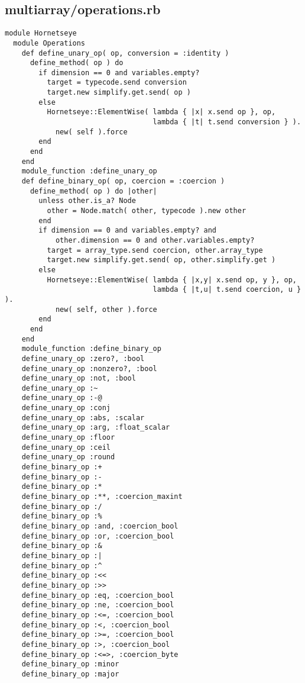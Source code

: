 \subsection{multiarray/operations.rb}\label{cha:multiarray-operations-rb}
\begin{lstlisting}
module Hornetseye
  module Operations
    def define_unary_op( op, conversion = :identity )
      define_method( op ) do
        if dimension == 0 and variables.empty?
          target = typecode.send conversion
          target.new simplify.get.send( op )
        else
          Hornetseye::ElementWise( lambda { |x| x.send op }, op,
                                   lambda { |t| t.send conversion } ).
            new( self ).force
        end
      end
    end
    module_function :define_unary_op
    def define_binary_op( op, coercion = :coercion )
      define_method( op ) do |other|
        unless other.is_a? Node
          other = Node.match( other, typecode ).new other
        end
        if dimension == 0 and variables.empty? and
            other.dimension == 0 and other.variables.empty?
          target = array_type.send coercion, other.array_type
          target.new simplify.get.send( op, other.simplify.get )
        else
          Hornetseye::ElementWise( lambda { |x,y| x.send op, y }, op,
                                   lambda { |t,u| t.send coercion, u } ).
            new( self, other ).force
        end
      end
    end
    module_function :define_binary_op
    define_unary_op :zero?, :bool
    define_unary_op :nonzero?, :bool
    define_unary_op :not, :bool
    define_unary_op :~
    define_unary_op :-@
    define_unary_op :conj
    define_unary_op :abs, :scalar
    define_unary_op :arg, :float_scalar
    define_unary_op :floor
    define_unary_op :ceil
    define_unary_op :round
    define_binary_op :+
    define_binary_op :-
    define_binary_op :*
    define_binary_op :**, :coercion_maxint
    define_binary_op :/
    define_binary_op :%
    define_binary_op :and, :coercion_bool
    define_binary_op :or, :coercion_bool
    define_binary_op :&
    define_binary_op :|
    define_binary_op :^
    define_binary_op :<<
    define_binary_op :>>
    define_binary_op :eq, :coercion_bool
    define_binary_op :ne, :coercion_bool
    define_binary_op :<=, :coercion_bool
    define_binary_op :<, :coercion_bool
    define_binary_op :>=, :coercion_bool
    define_binary_op :>, :coercion_bool
    define_binary_op :<=>, :coercion_byte
    define_binary_op :minor
    define_binary_op :major

\end{lstlisting}
